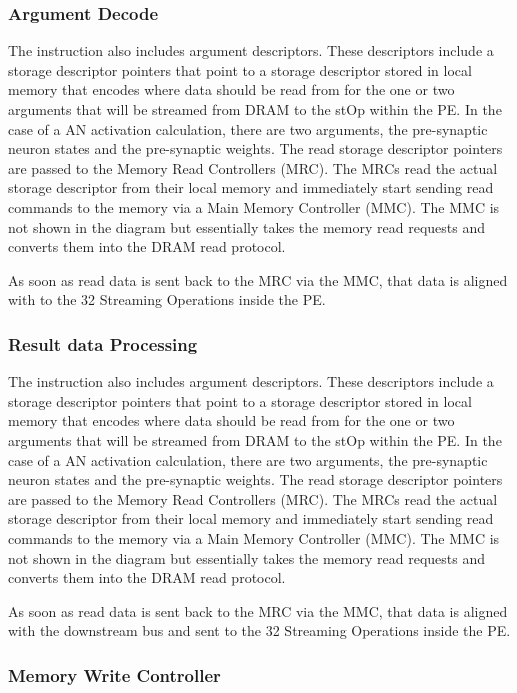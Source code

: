 \documentclass[journal]{IEEEtran}
\begin{document}
\subsubsection{Argument Decode}
\label{ssec:argumentDecode}
The instruction also includes argument descriptors. These descriptors include a storage descriptor pointers that point to a storage descriptor stored in local memory that encodes where data should be read from for the one or two arguments that will be streamed from DRAM to the stOp within the PE. In the case of a AN activation calculation, there are two arguments, the pre-synaptic neuron states and the pre-synaptic weights. The read storage descriptor pointers are passed to the Memory Read Controllers (MRC). The MRCs read the actual storage descriptor from their local memory and immediately start sending read commands to the memory via a Main Memory Controller (MMC). The MMC is not shown in the diagram but essentially takes the memory read requests and converts them into the DRAM read protocol.

As soon as read data is sent back to the MRC via the MMC, that data is aligned with to the 32 Streaming Operations inside the PE.


\subsubsection{Result data Processing}
\label{ssec:resultDataprocessing}
The instruction also includes argument descriptors. These descriptors include a storage descriptor pointers that point to a storage descriptor stored in local memory that encodes where data should be read from for the one or two arguments that will be streamed from DRAM to the stOp within the PE. In the case of a AN activation calculation, there are two arguments, the pre-synaptic neuron states and the pre-synaptic weights. The read storage descriptor pointers are passed to the Memory Read Controllers (MRC). The MRCs read the actual storage descriptor from their local memory and immediately start sending read commands to the memory via a Main Memory Controller (MMC). The MMC is not shown in the diagram but essentially takes the memory read requests and converts them into the DRAM read protocol.

As soon as read data is sent back to the MRC via the MMC, that data is aligned with the downstream bus and sent to the 32 Streaming Operations inside the PE.


\subsubsection{Memory Write Controller}
\label{ssec:memoryWriteController}
\end{document}
